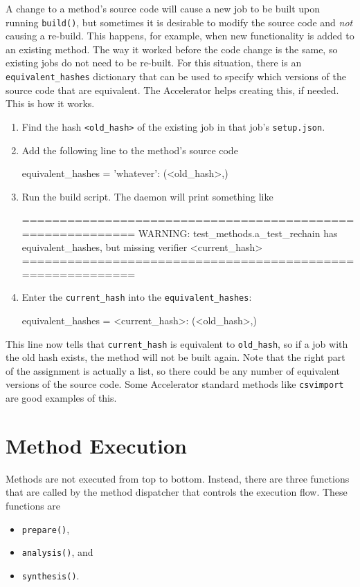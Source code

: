 A change to a method's source code will cause a new job to be built
upon running \texttt{build()}, but sometimes it is
desirable to modify the source code and \textsl{not} causing a
re-build.  This happens, for example, when new functionality is added
to an existing method.  The way it worked before the code change is
the same, so existing jobs do not need to be re-built.  For this
situation, there is an \texttt{equivalent\_hashes} dictionary that can
be used to specify which versions of the source code that are
equivalent.  The Accelerator helps creating this, if needed.  This is
how it works.
\begin{enumerate}
\item Find the hash \texttt{<old\_hash>} of the existing job in that job's \texttt{setup.json}.
\item Add the following line to the method's source code
\begin{python}
equivalent_hashes = {'whatever': (<old_hash>,)}
\end{python}
\item Run the build script.  The daemon will print something like
\begin{shell}
===========================================================
WARNING: test_methods.a_test_rechain has equivalent_hashes,
but missing verifier <current_hash>
===========================================================
\end{shell}
\item Enter the \texttt{current\_hash} into the \texttt{equivalent\_hashes}:
\begin{python}
equivalent_hashes = {<current_hash>: (<old_hash>,)}
\end{python}
\end{enumerate}
This line now tells that \texttt{current\_hash} is equivalent
to \texttt{old\_hash}, so if a job with the old hash exists, the
method will not be built again.  Note that the right part of the
assignment is actually a list, so there could be any number of
equivalent versions of the source code.  Some Accelerator standard
methods like \texttt{csvimport} are good examples of this.





\section{Method Execution}

Methods are not executed from top to bottom.  Instead, there are three
functions that are called by the method dispatcher that controls the
execution flow.  These functions are
\begin{itemize}
\item [] \texttt{prepare()},
\item [] \texttt{analysis()}, and
\item [] \texttt{synthesis()}.
\end{itemize}



